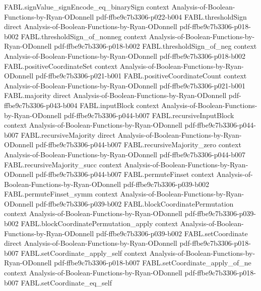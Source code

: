 \begin{theorem}
\proofstep
  {FABL.signValue_signEncode_eq_binarySign}
  {context}
  {Analysis-of-Boolean-Functions-by-Ryan-ODonnell}
  {pdf-ffbe9c7b3306-p022-b004}
\proofstep
  {FABL.thresholdSign}
  {direct}
  {Analysis-of-Boolean-Functions-by-Ryan-ODonnell}
  {pdf-ffbe9c7b3306-p018-b002}
\proofstep
  {FABL.thresholdSign_of_nonneg}
  {context}
  {Analysis-of-Boolean-Functions-by-Ryan-ODonnell}
  {pdf-ffbe9c7b3306-p018-b002}
\proofstep
  {FABL.thresholdSign_of_neg}
  {context}
  {Analysis-of-Boolean-Functions-by-Ryan-ODonnell}
  {pdf-ffbe9c7b3306-p018-b002}
\proofstep
  {FABL.positiveCoordinateSet}
  {context}
  {Analysis-of-Boolean-Functions-by-Ryan-ODonnell}
  {pdf-ffbe9c7b3306-p021-b001}
\proofstep
  {FABL.positiveCoordinateCount}
  {context}
  {Analysis-of-Boolean-Functions-by-Ryan-ODonnell}
  {pdf-ffbe9c7b3306-p021-b001}
\proofstep
  {FABL.majority}
  {direct}
  {Analysis-of-Boolean-Functions-by-Ryan-ODonnell}
  {pdf-ffbe9c7b3306-p043-b004}
\proofstep
  {FABL.inputBlock}
  {context}
  {Analysis-of-Boolean-Functions-by-Ryan-ODonnell}
  {pdf-ffbe9c7b3306-p044-b007}
\proofstep
  {FABL.recursiveInputBlock}
  {context}
  {Analysis-of-Boolean-Functions-by-Ryan-ODonnell}
  {pdf-ffbe9c7b3306-p044-b007}
\proofstep
  {FABL.recursiveMajority}
  {direct}
  {Analysis-of-Boolean-Functions-by-Ryan-ODonnell}
  {pdf-ffbe9c7b3306-p044-b007}
\proofstep
  {FABL.recursiveMajority_zero}
  {context}
  {Analysis-of-Boolean-Functions-by-Ryan-ODonnell}
  {pdf-ffbe9c7b3306-p044-b007}
\proofstep
  {FABL.recursiveMajority_succ}
  {context}
  {Analysis-of-Boolean-Functions-by-Ryan-ODonnell}
  {pdf-ffbe9c7b3306-p044-b007}
\proofstep
  {FABL.permuteFinset}
  {context}
  {Analysis-of-Boolean-Functions-by-Ryan-ODonnell}
  {pdf-ffbe9c7b3306-p039-b002}
\proofstep
  {FABL.permuteFinset_symm}
  {context}
  {Analysis-of-Boolean-Functions-by-Ryan-ODonnell}
  {pdf-ffbe9c7b3306-p039-b002}
\proofstep
  {FABL.blockCoordinatePermutation}
  {context}
  {Analysis-of-Boolean-Functions-by-Ryan-ODonnell}
  {pdf-ffbe9c7b3306-p039-b002}
\proofstep
  {FABL.blockCoordinatePermutation_apply}
  {context}
  {Analysis-of-Boolean-Functions-by-Ryan-ODonnell}
  {pdf-ffbe9c7b3306-p039-b002}
\proofstep
  {FABL.setCoordinate}
  {direct}
  {Analysis-of-Boolean-Functions-by-Ryan-ODonnell}
  {pdf-ffbe9c7b3306-p018-b007}
\proofstep
  {FABL.setCoordinate_apply_self}
  {context}
  {Analysis-of-Boolean-Functions-by-Ryan-ODonnell}
  {pdf-ffbe9c7b3306-p018-b007}
\proofstep
  {FABL.setCoordinate_apply_of_ne}
  {context}
  {Analysis-of-Boolean-Functions-by-Ryan-ODonnell}
  {pdf-ffbe9c7b3306-p018-b007}
\proofstep
  {FABL.setCoordinate_eq_self}

\end{theorem}
